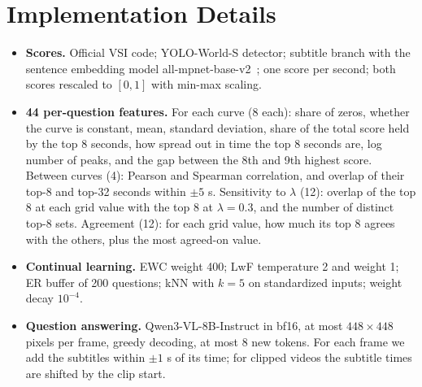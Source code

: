 \documentclass[10pt,twocolumn,letterpaper]{article}
\newcommand{\lam}{\lambda}
\begin{document}
\section{Implementation Details}
\begin{itemize}
  \item \textbf{Scores.} Official VSI code; YOLO-World-S detector; subtitle branch with the sentence embedding model all-mpnet-base-v2~\cite{reimers2019sbert}; one score per second; both scores rescaled to $[0,1]$ with min-max scaling.
  \item \textbf{44 per-question features.} For each curve (8 each): share of zeros, whether the curve is constant, mean, standard deviation, share of the total score held by the top 8 seconds, how spread out in time the top 8 seconds are, log number of peaks, and the gap between the 8th and 9th highest score. Between curves (4): Pearson and Spearman correlation, and overlap of their top-8 and top-32 seconds within $\pm5$ s. Sensitivity to $\lam$ (12): overlap of the top 8 at each grid value with the top 8 at $\lam=0.3$, and the number of distinct top-8 sets. Agreement (12): for each grid value, how much its top 8 agrees with the others, plus the most agreed-on value.
  \item \textbf{Continual learning.} EWC weight 400; LwF temperature 2 and weight 1; ER buffer of 200 questions; kNN with $k=5$ on standardized inputs; weight decay $10^{-4}$.
  \item \textbf{Question answering.} Qwen3-VL-8B-Instruct in bf16, at most $448\times448$ pixels per frame, greedy decoding, at most 8 new tokens. For each frame we add the subtitles within $\pm1$ s of its time; for clipped videos the subtitle times are shifted by the clip start.
\end{itemize}
\end{document}
